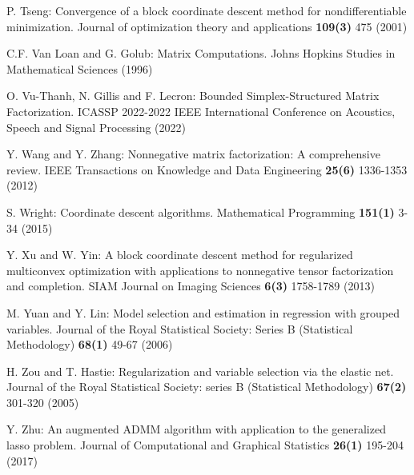\documentclass{svjour3}                %
\begin{document}
\begin{thebibliography}{10}
	P. Tseng: Convergence of a block coordinate descent method for nondifferentiable minimization. 
	\newblock Journal of optimization theory and applications
	\textbf{109(3)} 475 (2001)
	
	C.F. Van Loan and G. Golub: Matrix Computations.
	\newblock Johns Hopkins Studies in Mathematical Sciences (1996)
	
	O. Vu-Thanh, N. Gillis and F. Lecron: Bounded Simplex-Structured Matrix Factorization.
	\newblock ICASSP 2022-2022 IEEE International Conference on Acoustics, Speech and Signal Processing (2022)
	
	Y. Wang and Y. Zhang: Nonnegative matrix factorization: A comprehensive review. 
	\newblock IEEE Transactions on Knowledge and Data Engineering
	\textbf{25(6)} 1336-1353 (2012)
	
	S. Wright: Coordinate descent algorithms. 
	\newblock Mathematical Programming
	\textbf{151(1)} 3-34 (2015)
	
	Y. Xu and W. Yin: A block coordinate descent method for regularized multiconvex optimization with applications to nonnegative tensor factorization and completion.
	\newblock SIAM Journal on Imaging Sciences
	\textbf{6(3)} 1758-1789 (2013)
	
	M. Yuan and Y. Lin: Model selection and estimation in regression with grouped variables.
	\newblock Journal of the Royal Statistical Society: Series B (Statistical Methodology)
	\textbf{68(1)} 49-67 (2006)
	
	H. Zou and T. Hastie: Regularization and variable selection via the elastic net. \newblock Journal of the Royal Statistical Society: series B (Statistical Methodology) 
	\textbf{67(2)} 301-320 (2005)
	
	Y. Zhu: An augmented ADMM algorithm with application to the generalized lasso problem.
	\newblock Journal of Computational and Graphical Statistics
	\textbf{26(1)} 195-204 (2017)
	  
	
\end{thebibliography}
\end{document}
